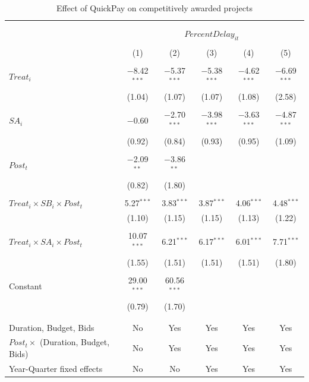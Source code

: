 \documentclass[
]{article}
\begin{document}
\begin{table}[H] \centering 
  \caption{Effect of QuickPay on competitively awarded projects} 
  \label{} 
\small 
\begin{tabular}{@{\extracolsep{-2pt}}lccccc} 
\\[-1.8ex]\hline 
\hline \\[-1.8ex] 
\\[-1.8ex] & \multicolumn{5}{c}{$PercentDelay_{it}$  } \\ 
\\[-1.8ex] & (1) & (2) & (3) & (4) & (5)\\ 
\hline \\[-1.8ex] 
 $Treat_i$ & $-$8.42$^{***}$ & $-$5.37$^{***}$ & $-$5.38$^{***}$ & $-$4.62$^{***}$ & $-$6.69$^{***}$ \\ 
  & (1.04) & (1.07) & (1.07) & (1.08) & (2.58) \\ 
  & & & & & \\ 
 $SA_i$ & $-$0.60 & $-$2.70$^{***}$ & $-$3.98$^{***}$ & $-$3.63$^{***}$ & $-$4.87$^{***}$ \\ 
  & (0.92) & (0.84) & (0.93) & (0.95) & (1.09) \\ 
  & & & & & \\ 
 $Post_t$ & $-$2.09$^{**}$ & $-$3.86$^{**}$ &  &  &  \\ 
  & (0.82) & (1.80) &  &  &  \\ 
  & & & & & \\ 
 $Treat_i \times SB_i \times Post_t$ & 5.27$^{***}$ & 3.83$^{***}$ & 3.87$^{***}$ & 4.06$^{***}$ & 4.48$^{***}$ \\ 
  & (1.10) & (1.15) & (1.15) & (1.13) & (1.22) \\ 
  & & & & & \\ 
 $Treat_i \times SA_i \times Post_t$ & 10.07$^{***}$ & 6.21$^{***}$ & 6.17$^{***}$ & 6.01$^{***}$ & 7.71$^{***}$ \\ 
  & (1.55) & (1.51) & (1.51) & (1.51) & (1.80) \\ 
  & & & & & \\ 
 Constant & 29.00$^{***}$ & 60.56$^{***}$ &  &  &  \\ 
  & (0.79) & (1.70) &  &  &  \\ 
  & & & & & \\ 
\hline \\[-1.8ex] 
Duration, Budget, Bids & No & Yes & Yes & Yes & Yes \\ 
$Post_t \times $  (Duration, Budget, Bids) & No & Yes & Yes & Yes & Yes \\ 
Year-Quarter fixed effects & No & No & Yes & Yes & Yes \\ 

\end{tabular}
\end{table}
\end{document}
